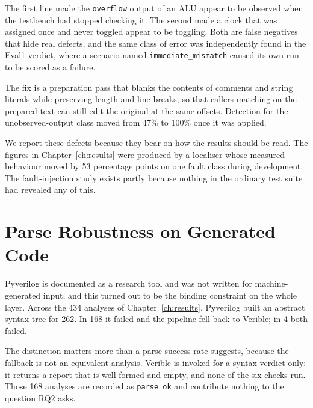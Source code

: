 \documentclass[11pt,a4paper,titlepage=false]{scrreprt}
\begin{document}
The first line made the \texttt{overflow} output of an ALU appear to be observed when the
testbench had stopped checking it. The second made a clock that was assigned once and never
toggled appear to be toggling. Both are false negatives that hide real defects, and the
same class of error was independently found in the Eval1 verdict, where a scenario named
\texttt{immediate\_mismatch} caused its own run to be scored as a failure.

The fix is a preparation pass that blanks the contents of comments and string literals
while preserving length and line breaks, so that callers matching on the prepared text can
still edit the original at the same offsets. Detection for the unobserved-output class
moved from 47\% to 100\% once it was applied.

We report these defects because they bear on how the results should be read. The figures in
Chapter~\ref{ch:results} were produced by a localiser whose measured behaviour moved by
53 percentage points on one fault class during development. The fault-injection study
exists partly because nothing in the ordinary test suite had revealed any of this.

\section{Parse Robustness on Generated Code}\label{sec:loc-parse}

Pyverilog is documented as a research tool and was not written for machine-generated input,
and this turned out to be the binding constraint on the whole layer. Across the 434 analyses
of Chapter~\ref{ch:results}, Pyverilog built an abstract syntax tree for 262. In 168 it
failed and the pipeline fell back to Verible; in 4 both failed.

The distinction matters more than a parse-success rate suggests, because the fallback is not
an equivalent analysis. Verible is invoked for a syntax verdict only: it returns a report
that is well-formed and empty, and none of the six checks run. Those 168 analyses are
recorded as \texttt{parse\_ok} and contribute nothing to the question RQ2 asks.
\end{document}
